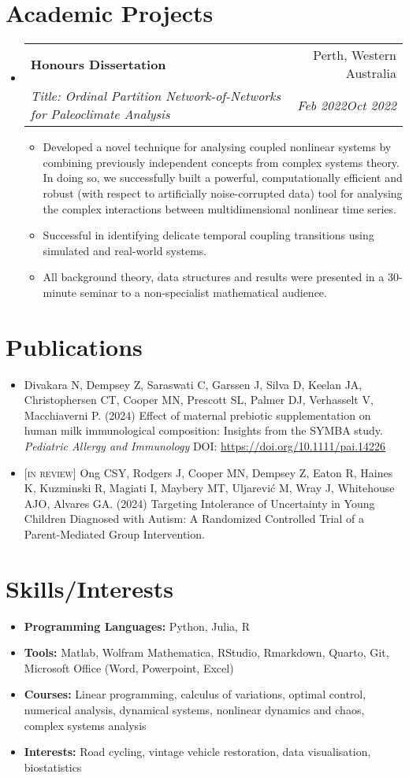 \documentclass[letterpaper,10.8pt]{article}
\makeatletter
\newcommand{\resumeItem}[2]{
  \item\small{
    \textbf{#1}{#2 \vspace{-2pt}}
  }
}
\newcommand{\resumeSubheading}[4]{
  \vspace{-1pt}\item
    \begin{tabular*}{0.97\textwidth}{l@{\extracolsep{\fill}}r}
      \textbf{#1} & #2 \\
      \textit{\small#3} & \textit{\small #4} \\
    \end{tabular*}\vspace{-5pt}
}
\newcommand{\resumeSubItem}[2]{\resumeItem{#1}{#2}\vspace{-4pt}}
\newcommand{\resumeSubHeadingListStart}{\begin{itemize}[leftmargin=*]}
\newcommand{\resumeSubHeadingListEnd}{\end{itemize}}
\newcommand{\resumeItemListStart}{\begin{itemize}}
\newcommand{\resumeItemListEnd}{\end{itemize}\vspace{-5pt}}
\makeatother
\begin{document}
\section{Academic Projects}
\resumeSubHeadingListStart
\resumeSubheading
    {Honours Dissertation}{Perth, Western Australia}
    {Title: Ordinal Partition Network-of-Networks for Paleoclimate Analysis}{Feb 2022\textendash Oct 2022}
    \resumeItemListStart
    \resumeItem{}{Developed a novel technique for analysing coupled nonlinear systems by combining previously independent concepts from complex systems theory. In doing so, we successfully built a powerful, computationally efficient and robust (with respect to artificially noise-corrupted data) tool for analysing the complex interactions between multidimensional nonlinear time series.}
    \resumeItem{}{Successful in identifying delicate temporal coupling transitions using simulated and real-world systems.}
    \resumeItem{}{All background theory, data structures and results were presented in a 30-minute seminar to a non-specialist mathematical audience.}
    \resumeItemListEnd
\resumeSubHeadingListEnd

\section{Publications}
\begin{itemize}
    \item Divakara N, Dempsey Z, Saraswati C, Garssen J, Silva D, Keelan JA, Christophersen CT, Cooper MN, Prescott SL, Palmer DJ, Verhasselt V, Macchiaverni P. (2024) Effect of maternal prebiotic supplementation on human milk immunological composition: Insights from the SYMBA study. \textit{Pediatric Allergy and Immunology} DOI: \url{https://doi.org/10.1111/pai.14226}
    \item \textsc{[in review]} Ong CSY, Rodgers J, Cooper MN, Dempsey Z, Eaton R, Haines K, Kuzminski R, Magiati I, Maybery MT, Uljarević M, Wray J, Whitehouse AJO, Alvares GA. (2024) Targeting Intolerance of Uncertainty in Young Children Diagnosed with Autism: A Randomized Controlled Trial of a Parent-Mediated Group Intervention.
\end{itemize}

\section{Skills/Interests}
	\resumeSubHeadingListStart
	\resumeSubItem{Programming Languages: }{Python, Julia, R}
	\resumeSubItem{Tools: }{Matlab, Wolfram Mathematica, RStudio, Rmarkdown, Quarto, Git, Microsoft Office (Word, Powerpoint, Excel)}
	\resumeSubItem{Courses: }{Linear programming, calculus of variations, optimal control, numerical analysis, dynamical systems, nonlinear dynamics and chaos, complex systems analysis}
	\resumeSubItem{Interests: }{Road cycling, vintage vehicle restoration, data visualisation, biostatistics}
\resumeSubHeadingListEnd
\end{document}
